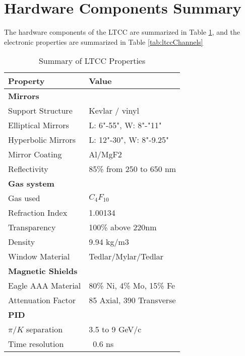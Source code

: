 \section{Hardware Components Summary}


The hardware components of the LTCC are summarized in Table \ref{tab:ltccProperties}, and the electronic properties
are summarized in Table \ref{tab:ltccChannels}

\begin{table}[h]
	\begin{center}
		\begin{tabular}{| l | l |}
			\hline \hline
			Property                 & Value \\
			\hline
			{\bf Mirrors}            &                               \\
			Support Structure        & Kevlar / vinyl                \\
			Elliptical Mirrors       & L: 6"-55", W: 8"-"11"         \\
			Hyperbolic Mirrors       & L: 12"-30", W: 8"-9.25"       \\
			Mirror Coating           & Al/MgF2                       \\
			Reflectivity             & 85\% from 250 to 650 nm       \\
			{\bf Gas system}         &                               \\
			Gas used                 &   $C_4F_{10}$                 \\
			Refraction Index         & 1.00134                       \\
			Transparency             & 100\% above 220nm             \\
			Density                  & 9.94 kg/m3                    \\
			Window Material          & Tedlar/Mylar/Tedlar           \\
			{\bf Magnetic Shields}   &                               \\
			Eagle AAA Material       & 80\% Ni, 4\% Mo, 15\% Fe      \\
			Attenuation Factor       &  85 Axial, 390 Transverse     \\
			{\bf PID}                &                               \\
			$\pi/K$ separation       &  3.5 to 9 GeV/c               \\
			Time resolution          &  ~0.6 ns                      \\
			\hline \hline
		\end{tabular}
	\end{center}
\caption{Summary of LTCC Properties}\label{tab:ltccProperties}
\end{table}

